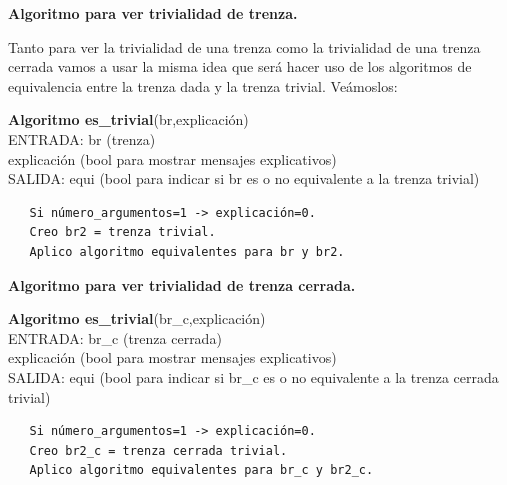 \begin{center}
	\textbf{Algoritmo para ver trivialidad de trenza.}
\end{center} 
Tanto para ver la trivialidad de una trenza como la trivialidad de una trenza cerrada vamos a usar la misma idea que será hacer uso de los algoritmos de equivalencia entre la trenza dada y la trenza trivial. Veámoslos:

\begin{alg}
	\textbf{Algoritmo es\_trivial}(br,explicación)\\
	ENTRADA: br (trenza)\\
	\hspace*{2.2cm} explicación (bool para mostrar mensajes explicativos)\\
	SALIDA: \hspace{0.4cm} equi (bool para indicar si br es o no equivalente a la trenza trivial)
	
\begin{lstlisting}
   Si número_argumentos=1 -> explicación=0.
   Creo br2 = trenza trivial. 
   Aplico algoritmo equivalentes para br y br2.
\end{lstlisting}
\end{alg}

\begin{center}
	\textbf{Algoritmo para ver trivialidad de trenza cerrada.}
\end{center} 

\begin{alg}
	\textbf{Algoritmo es\_trivial}(br\_c,explicación)\\
	ENTRADA: br\_c (trenza cerrada)\\
	\hspace*{2.2cm} explicación (bool para mostrar mensajes explicativos)\\
	SALIDA: \hspace{0.4cm} equi (bool para indicar si br\_c es o no equivalente a la trenza cerrada trivial)
	
\begin{lstlisting}
   Si número_argumentos=1 -> explicación=0.
   Creo br2_c = trenza cerrada trivial. 
   Aplico algoritmo equivalentes para br_c y br2_c.
\end{lstlisting}
\end{alg}

